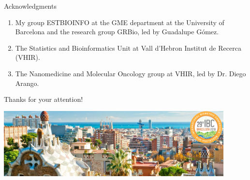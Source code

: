 \documentclass[handout]{beamer}
\begin{document}
\begin{frame}{Acknowledgments}
	\begin{enumerate}
		\item My group ESTBIOINFO at the GME department at the University of Barcelona and the research group GRBio, led by Guadalupe Gómez.
		\item The Statistics and Bioinformatics Unit at Vall d'Hebron Institut de Recerca (VHIR).
		\item The Nanomedicine and Molecular Oncology group at VHIR, led by Dr. Diego Arango.
	\end{enumerate}
\end{frame}

\begin{frame}
	\begin{center}
		{\Huge
			Thanks for your attention!}
	\end{center}
	
	\begin{center}
		\includegraphics[width=0.9\textwidth]{./images/ibc-2018-barcelona.jpg}
	\end{center}
	
	
\end{frame}
\end{document}
